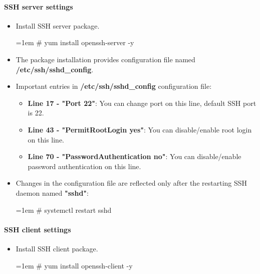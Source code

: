 \setlength{\columnsep}{3pt}
\begin{flushleft}

\bigskip
\paragraph{SSH server settings}
\begin{itemize}
	\item Install SSH server package.
	\bigskip
	\begin{tcolorbox}[breakable,notitle,boxrule=-0pt,colback=black,colframe=black]
		\color{green}
		\font=1em
		\# yum install openssh-server -y
		\font=4pt
	\end{tcolorbox}
	\bigskip
	\item The package installation provides configuration file named \textbf{/etc/ssh/sshd\_config}.
	\bigskip
	\item Important entries in \textbf{/etc/ssh/sshd\_config} configuration file:
	\begin{itemize}
		\item \textbf{Line 17 - "Port 22"}: You can change port on this line, default SSH port is 22.
		\item \textbf{Line 43 - "PermitRootLogin yes"}: You can disable/enable root login on this line.
		\item \textbf{Line 70 - "PasswordAuthentication no"}: You can disable/enable password authentication on this line.
	\end{itemize}
	\bigskip
	\item Changes in the configuration file are reflected only after the restarting SSH daemon named \textbf{"sshd"}:
	\bigskip
	\begin{tcolorbox}[breakable,notitle,boxrule=-0pt,colback=black,colframe=black]
		\color{green}
		\font=1em
		\# systemctl restart sshd
		\font=4pt
	\end{tcolorbox}
\end{itemize}

\bigskip

\paragraph{SSH client settings}
\begin{itemize}
	\item Install SSH client package.
	\bigskip
	\begin{tcolorbox}[breakable,notitle,boxrule=-0pt,colback=black,colframe=black]
		\color{green}
		\font=1em
		\# yum install openssh-client -y
		\font=4pt
	\end{tcolorbox}
\end{itemize}


\end{flushleft}
\newpage


